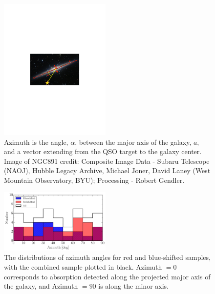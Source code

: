 \documentclass[twocolumn,tighten]{aastex6}
\begin{document}
\begin{figure}[ht!]
        \centering
        \includegraphics[width=0.49\textwidth]{fig11.pdf}
        \caption{\small{Azimuth is the angle, $\alpha$, between the major axis of the galaxy, $a$, and a vector extending from the QSO target to the galaxy center. Image of NGC891 credit: Composite Image Data - Subaru Telescope (NAOJ), Hubble Legacy Archive, Michael Joner, David Laney (West Mountain Observatory, BYU); Processing - Robert Gendler.}}
        \label{azimuth_illustration}
        \vspace{5pt}
\end{figure} 

\begin{figure}[ht!]
        \centering
        \includegraphics[width=0.49\textwidth]{fig12.pdf}
        \caption{\small{The distributions of azimuth angles for red and blue-shifted samples, with the combined sample plotted in black. Azimuth $= 0$ corresponds to absorption detected along the projected major axis of the galaxy, and Azimuth $= 90$ is along the minor axis.}}
        \label{azimuth_dist}
        \vspace{5pt}
\end{figure}
\end{document}
